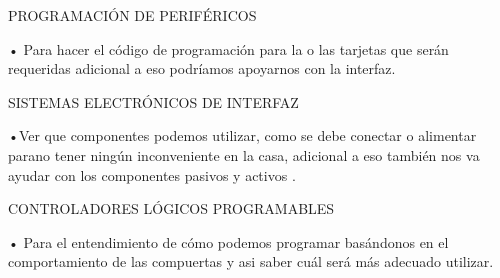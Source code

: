 \documentclass[12pt,a4paper]{article}
\begin{document}
\begin{flushleft}
PROGRAMACIÓN DE PERIFÉRICOS
\end{flushleft}
\begin{center}
• Para hacer el código de programación  para la o las tarjetas que serán requeridas adicional a eso podríamos apoyarnos con la interfaz.
\end{center}
\begin{flushleft}
SISTEMAS ELECTRÓNICOS DE INTERFAZ
\end{flushleft}
\begin{center}
•Ver que componentes podemos  utilizar, como se debe conectar  o alimentar parano tener ningún inconveniente en la casa, adicional a eso también nos va ayudar  con los componentes pasivos y activos .
\end{center}
\begin{flushleft}
CONTROLADORES LÓGICOS PROGRAMABLES
\end{flushleft}
\begin{center}
• Para el entendimiento de cómo podemos programar basándonos en el comportamiento de las compuertas y asi saber cuál será más adecuado utilizar.
\end{center}
\end{document}
